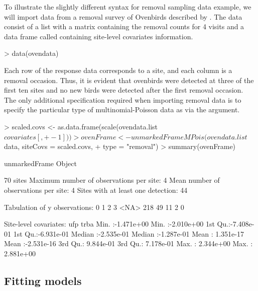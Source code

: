 \documentclass[article,shortnames]{jss}
\begin{document}
To illustrate the slightly different syntax for removal sampling data example, we will import data from a removal survey of Ovenbirds described by \citet{Royle2004a}.  The data consist of a list with a matrix  containing the removal counts for 4 visits and a data frame called  containing site-level covariates information.

\begin{Schunk}
\begin{Sinput}
> data(ovendata)
\end{Sinput}
\end{Schunk}

Each row of the response data corresponds to a site, and each column is a removal occasion. Thus, it is evident that ovenbirds were detected at three of the first ten sites and no new birds were detected after the first removal occasion.  The only additional specification required when importing removal data is to
specify the particular type of multinomial-Poisson data as
 via the  argument.

\begin{Schunk}
\begin{Sinput}
> scaled.covs <- as.data.frame(scale(ovendata.list$covariates[, 
+     -1]))
> ovenFrame <- unmarkedFrameMPois(ovendata.list$data, siteCovs = scaled.covs, 
+     type = "removal")
> summary(ovenFrame)
\end{Sinput}
\begin{Soutput}
unmarkedFrame Object

70 sites
Maximum number of observations per site: 4 
Mean number of observations per site: 4 
Sites with at least one detection: 44 

Tabulation of y observations:
   0    1    2    3 <NA> 
 218   49   11    2    0 

Site-level covariates:
      ufp                  trba           
 Min.   :-1.471e+00   Min.   :-2.010e+00  
 1st Qu.:-7.408e-01   1st Qu.:-6.931e-01  
 Median :-2.535e-01   Median :-1.287e-01  
 Mean   : 1.351e-17   Mean   :-2.531e-16  
 3rd Qu.: 9.844e-01   3rd Qu.: 7.178e-01  
 Max.   : 2.344e+00   Max.   : 2.881e+00  
\end{Soutput}
\end{Schunk}


\subsection{Fitting models}
\label{sec:fitting-models}
\end{document}
